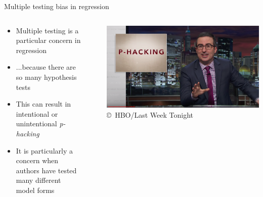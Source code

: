 \begin{frame}{Multiple testing bias in regression}
  \begin{columns}
    \begin{column}{0.65\textwidth}
      \begin{itemize}
        \item Multiple testing is a particular concern in regression
        \item ...because there are so many hypothesis tests
        \item This can result in intentional or unintentional \emph{p-hacking}
        \item It is particularly a concern when authors have tested many different model forms
      \end{itemize}
    \end{column}~%
    \begin{column}{0.34\textwidth}
      \includegraphics[width=\textwidth]{img/phacking-lastweek.png}\\
      {\tiny \copyright~HBO/Last Week Tonight}
    \end{column}
  \end{columns}
\end{frame}


